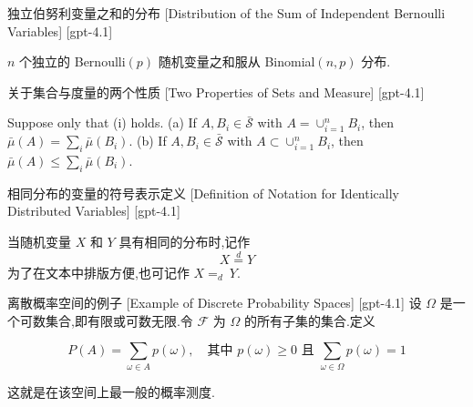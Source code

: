 \documentclass[UTF8]{ctexart}
\begin{document}
    
    
    \begin{thm}
        {独立伯努利变量之和的分布}
        [Distribution of the Sum of Independent Bernoulli Variables]
        [gpt-4.1]
        
$n$ 个独立的 Bernoulli$(p)$ 随机变量之和服从 Binomial$(n, p)$ 分布.

    \end{thm}
    
    
    
    \begin{lma}
        {关于集合与度量的两个性质}
        [Two Properties of Sets and Measure]
        [gpt-4.1]
        
Suppose only that (i) holds.
(a) If $A, B_{i} \in \bar{\mathcal{S}}$ with $A = \cup_{i=1}^{n} B_{i}$, then $\bar{\mu}(A) = \sum_{i} \bar{\mu}(B_{i})$.
(b) If $A, B_{i} \in \bar{\mathcal{S}}$ with $A \subset \cup_{i=1}^{n} B_{i}$, then $\bar{\mu}(A) \leq \sum_{i} \bar{\mu}(B_{i})$.

    \end{lma}
    
    
    
    \begin{dfn}
        {相同分布的变量的符号表示定义}
        [Definition of Notation for Identically Distributed Variables]
        [gpt-4.1]
        
当随机变量 $X$ 和 $Y$ 具有相同的分布时,记作
\[
X \overset{d}{=} Y
\]
为了在文本中排版方便,也可记作 $X =_d~ Y$.

    \end{dfn}
    
    
    
    \begin{xmp}
        {离散概率空间的例子}
        [Example of Discrete Probability Spaces]
        [gpt-4.1]
        设 $\Omega$ 是一个可数集合,即有限或可数无限.令 ${\mathcal{F}}$ 为 $\Omega$ 的所有子集的集合.定义

\[
P(A) = \sum_{\omega \in A} p(\omega),\quad \text{其中 } p(\omega) \geq 0 \text{ 且 } \sum_{\omega \in \Omega} p(\omega) = 1
\]

这就是在该空间上最一般的概率测度.

    \end{xmp}
    
\end{document}

